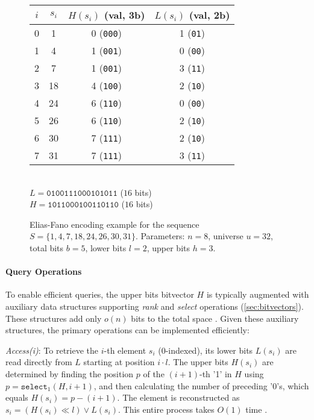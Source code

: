 \begin{figure}[hbtp]
    \centering
    \footnotesize
    \vspace{0.5em}
    \begin{tabular}{c | c | c c} \hline
        $i$ & $s_i$ & $H(s_i)$ (val, 3b) & $L(s_i)$ (val, 2b) \\ \hline
        0   & 1     & 0 (\texttt{000})   & 1 (\texttt{01})    \\
        1   & 4     & 1 (\texttt{001})   & 0 (\texttt{00})    \\
        2   & 7     & 1 (\texttt{001})   & 3 (\texttt{11})    \\
        3   & 18    & 4 (\texttt{100})   & 2 (\texttt{10})    \\
        4   & 24    & 6 (\texttt{110})   & 0 (\texttt{00})    \\
        5   & 26    & 6 (\texttt{110})   & 2 (\texttt{10})    \\
        6   & 30    & 7 (\texttt{111})   & 2 (\texttt{10})    \\
        7   & 31    & 7 (\texttt{111})   & 3 (\texttt{11})    \\ \hline
    \end{tabular} \\
    \vspace{0.5em}
    $L = \texttt{0100111000101011}$ ($16$ bits) \\
    $H = \texttt{1011000100110110}$ ($16$ bits)
    \caption{Elias-Fano encoding example for the sequence $S = \{1, 4, 7, 18, 24, 26, 30, 31\}$. Parameters: $n=8$, universe $u=32$, total bits $b=5$, lower bits $l=2$, upper bits $h=3$.}
    \label{fig:ef_code_example}
\end{figure}

\paragraph{Query Operations}
To enable efficient queries, the upper bits bitvector $H$ is typically augmented with auxiliary data structures supporting \emph{rank} and \emph{select} operations (\autoref{sec:bitvectors}). These structures add only $o(n)$ bits to the total space \cite{ferragina2023pearls}. Given these auxiliary structures, the primary operations can be implemented efficiently:

\emph{Access(i)}: To retrieve the $i$-th element $s_i$ (0-indexed), its lower bits $L(s_i)$ are read directly from $L$ starting at position $i \cdot l$. The upper bits $H(s_i)$ are determined by finding the position $p$ of the $(i+1)$-th '1' in $H$ using $p = \texttt{select}_1(H, i+1)$, and then calculating the number of preceding '0's, which equals $H(s_i) = p - (i+1)$. The element is reconstructed as $s_i = (H(s_i) \ll l) \lor L(s_i)$. This entire process takes $O(1)$ time \cite{pibiri_et_al}.

